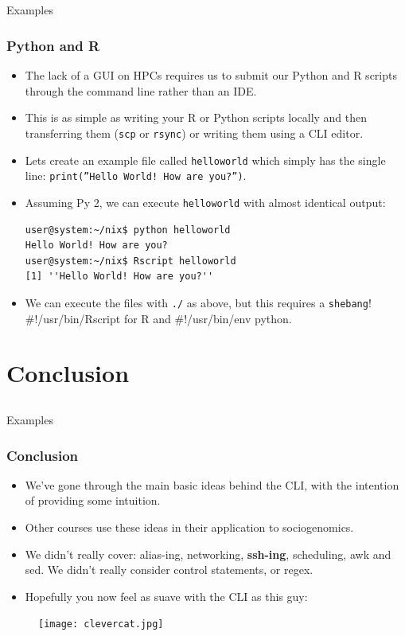 \documentclass[10pt]{beamer}
\begin{document}
\subsection{}
\begin{frame}[fragile]{Examples}
\frametitle{Python and R}
\begin{itemize}
\item The lack of a GUI on HPCs requires us to submit our Python and R scripts through the command line rather than an IDE.\vspace{0.05in}
\item This is as simple as writing your R or Python scripts locally and then transferring them (\texttt{scp} or \texttt{rsync}) or writing them using a CLI editor.\vspace{0.05in}
\item Lets create an example file called \texttt{helloworld} which simply has the single line: \texttt{print(''Hello World! How are you?'')}.\vspace{0.05in}
\item Assuming Py 2, we can execute \texttt{helloworld} with almost identical output:\vspace{0.05in}
\begin{lstlisting}[style=BashInputStyle]
user@system:~/nix$ python helloworld
Hello World! How are you?
user@system:~/nix$ Rscript helloworld
[1] ''Hello World! How are you?''
\end{lstlisting}\vspace{0.1in}
\item We can execute the files with \texttt{./} as above, but this requires a \texttt{shebang}! \#!/usr/bin/Rscript for R and \#!/usr/bin/env python. 
\end{itemize}
\end{frame}


\section{Conclusion}
\subsection{}
\begin{frame}[fragile]{Examples}
\frametitle{Conclusion}
\begin{itemize}
\item We've gone through the main basic ideas behind the CLI, with the intention of providing some intuition.\vspace{0.05in}\pause
\item Other courses use these ideas in their application to sociogenomics.\vspace{0.05in}\pause
\item We didn't really cover: alias-ing, networking, \textbf{ssh-ing}, scheduling, awk and sed. We didn't really consider control statements, or regex.\vspace{0.05in} \pause
\item Hopefully you now feel as suave with the CLI as this guy:
\end{itemize}
\begin{figure}[!b]
\texttt{[image: clevercat.jpg]}
\end{figure}
\end{frame}
\end{document}
